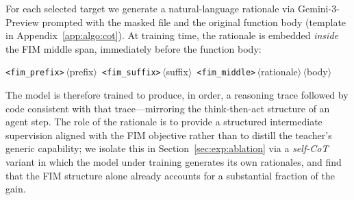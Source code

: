 For each selected target we generate a natural-language rationale via
Gemini-3-Preview prompted with the masked file and the original function
body (template in Appendix~\ref{app:algo:cot}). At training time, the
rationale is embedded \emph{inside} the FIM middle span, immediately
before the function body:
%
\begin{center}\small
\texttt{<fim\_prefix>}\,$\langle$prefix$\rangle$\,%
\texttt{<fim\_suffix>}\,$\langle$suffix$\rangle$\,%
\texttt{<fim\_middle>}\,$\langle$rationale$\rangle$\,$\langle$body$\rangle$
\end{center}
%
The model is therefore trained to produce, in order, a reasoning trace
followed by code consistent with that trace---mirroring the
think-then-act structure of an agent step. The role of the rationale is
to provide a structured intermediate supervision aligned with the FIM
objective rather than to distill the teacher's generic capability; we
isolate this in Section~\ref{sec:exp:ablation} via a \emph{self-CoT}
variant in which the model under training generates its own rationales,
and find that the FIM structure alone already accounts for a substantial
fraction of the gain.
